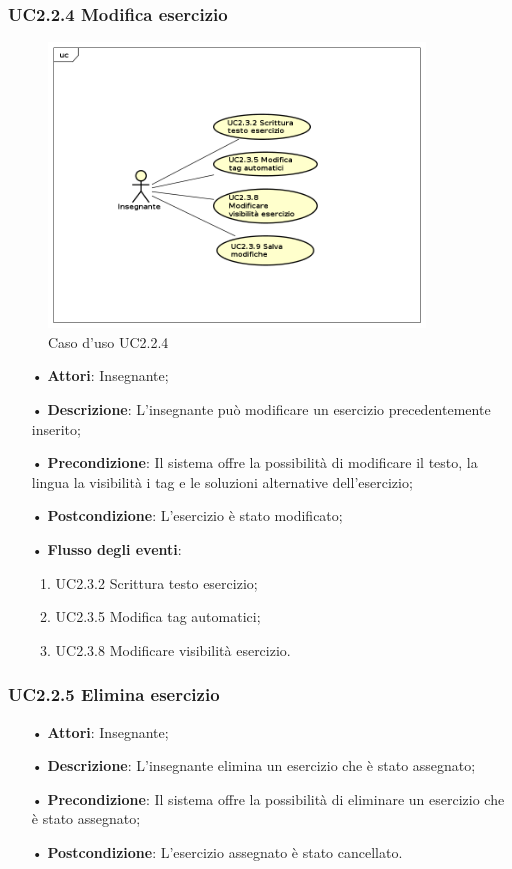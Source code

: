 \subsubsection{UC2.2.4 Modifica esercizio}

\begin{figure}[H]
\centering
\includegraphics[width=10cm]{img/UC224.png} 
\caption{Caso d'uso UC2.2.4}
\end{figure}

\begin{itemize}
	\item[•] \textbf{Attori}: Insegnante;
	\item[•] \textbf{Descrizione}: L’insegnante può modificare un esercizio precedentemente inserito;
	\item[•] \textbf{Precondizione}: Il sistema offre la possibilità di modificare il testo, la
				lingua la visibilità i tag e le soluzioni alternative 
				dell’esercizio;
	\item[•] \textbf{Postcondizione}: L’esercizio è stato modificato;
	\item[•] \textbf{Flusso degli eventi}:
		\begin{enumerate}
			\item UC2.3.2 Scrittura testo esercizio;
			\item UC2.3.5 Modifica tag automatici;
			\item UC2.3.8 Modificare visibilità esercizio.
		\end{enumerate}
		    
\end{itemize}   	
	
\subsubsection{UC2.2.5 Elimina esercizio}
\begin{itemize}
	\item[•] \textbf{Attori}: Insegnante;
	\item[•] \textbf{Descrizione}: L’insegnante elimina un esercizio che è stato assegnato;
	\item[•] \textbf{Precondizione}: Il sistema offre la possibilità di eliminare un esercizio che è stato assegnato;
	\item[•] \textbf{Postcondizione}: L’esercizio assegnato è stato cancellato.
\end{itemize}

